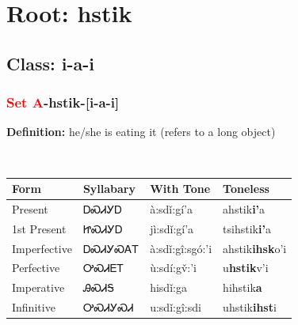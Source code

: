 \needspace{4in}
\section*{Root: hstik}
\nopagebreak
{}
\needspace{3in}
\subsection*{Class: i-a-i}
\nopagebreak
\needspace{2in}
\subsubsection*{\textcolor{Red}{Set A}{-}\textbf{hstik}{-}[i-a-i]}
\nopagebreak
\textbf{Definition: } he/she is eating it (refers to a long object)
\\[0.5em]
\begin{tabularx}{\textwidth}{l X X X}%
\toprule%
\textbf{Form}&\textbf{Syllabary}&\textbf{With Tone}&\textbf{Toneless}\\%
\midrule%
Present&ᎠᏍᏗᎩᎠ&à:sdǐ:gí’a&ahstik\textbf{i'}a\\%
1st Present&ᏥᏍᏗᎩᎠ&jì:sdǐ:gí’a&tsihstik\textbf{i'}a\\%
Imperfective&ᎠᏍᏗᎩᏍᎪᎢ&à:sdǐ:gî:sgó:’i&ahstik\textbf{ihsk}o'i\\%
Perfective&ᎤᏍᏗᎬᎢ&ù:sdí:gv̌:’i&u\textbf{hstik}v'i\\%
Imperative&ᎯᏍᏗᎦ&hisdǐ:ga&hihstik\textbf{a}\\%
Infinitive&ᎤᏍᏗᎩᏍᏗ&u:sdǐ:gî:sdi&uhstik\textbf{ihst}i\\%
\bottomrule%
\end{tabularx}
\\[1em]